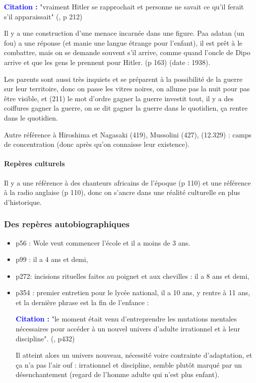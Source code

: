 \documentclass[a4paper, 11pt, hidelinks]{article}
\newcommand{\bs}{\bigskip}
\newcommand{\cit}{\large \textcolor{blue}{\textbf{Citation :}} \large }
\newcommand{\rb}[1]{\Romanbar{#1}}
\begin{document}
\cit "vraiment Hitler se rapprochait et personne ne savait ce qu'il ferait s'il apparaissait" (\rb{7}, p 212)

\bs
Il y a une construction d'une menace incarnée dans une figure. Paa adatan (un fou) a une réponse
(et manie une langue étrange pour l'enfant), il est prêt à le combattre, mais on se demande souvent
s'il arrive, comme quand l'oncle de Dipo arrive et que les gens le prennent pour Hitler. (p 163)
(date : 1938).

\bs

Les parents sont aussi très inquiets et se préparent à la possibilité de la guerre sur leur territoire,
donc on passe les vitres noires, on allume pas la nuit pour pas être visible, et (211)
le mot d'ordre gagner la guerre investit tout, il y a des coiffures gagner la
guerre, on se dit gagner la guerre dans le quotidien, ça rentre dans le quotidien.
\bs

Autre référence à Hiroshima et Nagasaki (419), Mussolini (427), (12.329) : camps de concentration (donc
après qu'on connaisse leur existence).


\paragraph{Repères culturels}

Il y a une référence à des chanteurs africains de l'époque (p 110) et une référence à la radio anglaise (p 110),
donc on s'ancre dans une réalité culturelle en plus d'historique.


\subsubsection{Des repères autobiographiques}


\begin{itemize}
    \item p56 : Wole veut commencer l'école et il a moins de 3 ans.
    \item p99 : il a 4 ans et demi,
    \item p272: incisions rituelles faites au poignet et aux chevilles : il a 8 ans et demi,
    \item p354 : premier entretien pour le lycée national, il a 10 ans, y rentre à 11 ans, et la dernière phrase est la fin de l'enfance :


          \cit "le moment était venu d'entreprendre les mutations mentales nécessaires pour accéder à un nouvel univers
          d'adulte irrationnel et à leur discipline". (\rb{15}, p432)


          Il atteint alors un univers nouveau, nécessité voire contrainte d'adaptation, et ça n'a pas l'air ouf :
          irrationnel et discipline, semble plutôt marqué par un désenchantement (regard de l'homme adulte qui
          n'est plus enfant).
\end{itemize}
\end{document}
